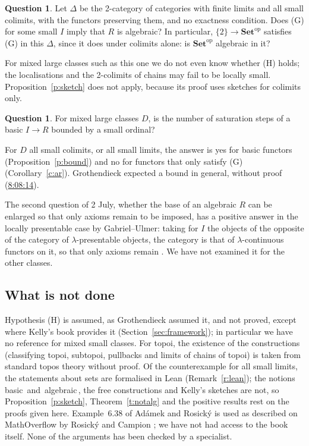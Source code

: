 \documentclass[11pt,a4paper]{amsart}
\theoremstyle{definition}
\newtheorem{question}[theorem]{Question}
\theoremstyle{remark}
\newcommand{\q}[1]{\guillemotleft\,#1\,\guillemotright}
\newcommand{\ts}[3]{\href{https://www.youtube.com/watch?v=#1&t=#2}{#3}}
\newcommand{\Set}{\mathbf{Set}}
\begin{document}
\begin{question}\label{q:mixed}
Let $\Delta$ be the 2-category of categories with finite limits and all small colimits, with the functors preserving them, and no exactness condition. Does (G) for some small $I$ imply that $R$ is algebraic? In particular, $\{2\}\to\Set^{\mathrm{op}}$ satisfies (G) in this $\Delta$, since it does under colimits alone: is $\Set^{\mathrm{op}}$ algebraic in it?
\end{question}

For mixed large classes such as this one we do not even know whether (H) holds; the localisations and the 2-colimits of chains may fail to be locally small. Proposition~\ref{p:sketch} does not apply, because its proof uses sketches for colimits only.

\begin{question}\label{q:steps}
For mixed large classes $D$, is the number of saturation steps of a basic $I\to R$ bounded by a small ordinal?
\end{question}

For $D$ all small colimits, or all small limits, the answer is yes for basic functors (Proposition~\ref{p:bound}) and no for functors that only satisfy (G) (Corollary~\ref{c:ar}). Grothendieck expected a bound in general, without proof (\ts{PqCQM3Pcl6Q}{8h8m14s}{8:08:14}).

The second question of 2 July, whether the base of an algebraic $R$ can be enlarged so that only axioms remain to be imposed, has a positive answer in the locally presentable case by Gabriel--Ulmer: taking for $I$ the objects of the opposite of the category of $\lambda$-presentable objects, the category is that of $\lambda$-continuous functors on it, so that only axioms remain \cite{gu}. We have not examined it for the other classes.

\subsection*{What is not done}
Hypothesis (H) is assumed, as Grothendieck assumed it, and not proved, except where Kelly's book provides it (Section~\ref{sec:framework}); in particular we have no reference for mixed small classes. For topoi, the existence of the constructions (classifying topoi, subtopoi, pullbacks and limits of chains of topoi) is taken from standard topos theory without proof. Of the counterexample for all small limits, the statements about sets are formalised in Lean (Remark~\ref{r:lean}); the notions \q{basic} and \q{algebraic}, the free constructions and Kelly's sketches are not, so Proposition~\ref{p:sketch}, Theorem~\ref{t:notalg} and the positive results rest on the proofs given here. Example~6.38 of Adámek and Rosický is used as described on MathOverflow by Rosický and Campion \cite{mo}; we have not had access to the book itself. None of the arguments has been checked by a specialist.
\end{document}
